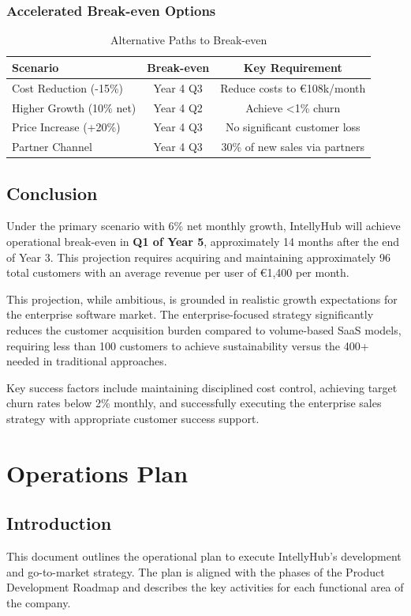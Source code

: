 \documentclass[11pt, a4paper, oneside]{article}
\begin{document}
\subsubsection{Accelerated Break-even Options}
\begin{table}[H]
    \centering
    \caption{Alternative Paths to Break-even}
    \begin{tabular}{lcc}
    \toprule
    \textbf{Scenario} & \textbf{Break-even} & \textbf{Key Requirement} \\
    \midrule
    Cost Reduction (-15\%) & Year 4 Q3 & Reduce costs to \euro{108k/month} \\
    Higher Growth (10\% net) & Year 4 Q2 & Achieve <1\% churn \\
    Price Increase (+20\%) & Year 4 Q3 & No significant customer loss \\
    Partner Channel & Year 4 Q3 & 30\% of new sales via partners \\
    \bottomrule
    \end{tabular}
\end{table}

\subsection{Conclusion}
Under the primary scenario with 6\% net monthly growth, IntellyHub will achieve operational break-even in \textbf{Q1 of Year 5}, approximately 14 months after the end of Year 3. This projection requires acquiring and maintaining approximately 96 total customers with an average revenue per user of \euro{1,400} per month.

This projection, while ambitious, is grounded in realistic growth expectations for the enterprise software market. The enterprise-focused strategy significantly reduces the customer acquisition burden compared to volume-based SaaS models, requiring less than 100 customers to achieve sustainability versus the 400+ needed in traditional approaches.

Key success factors include maintaining disciplined cost control, achieving target churn rates below 2\% monthly, and successfully executing the enterprise sales strategy with appropriate customer success support.
\section{Operations Plan}
\subsection*{Introduction}
This document outlines the operational plan to execute IntellyHub's development and go-to-market strategy. The plan is aligned with the phases of the Product Development Roadmap and describes the key activities for each functional area of the company.
\end{document}
